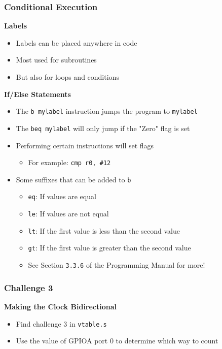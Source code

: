 \documentclass{beamer}
\begin{document}
\begin{frame}
    \frametitle{Conditional Execution}
	\textbf{Labels}
    \begin{itemize}
        \item Labels can be placed anywhere in code
		\item Most used for subroutines
		\item But also for loops and conditions
    \end{itemize}
    \textbf{If/Else Statements}
    \begin{itemize}
		\item The \texttt{b mylabel} instruction jumps the program to \texttt{mylabel}
		\item The \texttt{beq mylabel} will only jump if the "Zero" flag is set
		\item Performing certain instructions will set flags
		\begin{itemize}
			\item For example: \texttt{cmp r0, \#12}
		\end{itemize}
		\item Some suffixes that can be added to \texttt{b}
		\begin{itemize}
			\item \texttt{\texttildelow eq}: If values are equal
			\item \texttt{\texttildelow le}: If values are not equal
			\item \texttt{\texttildelow lt}: If the first value is less than the second value
			\item \texttt{\texttildelow gt}: If the first value is greater than the second value
			\item See Section \texttt{3.3.6} of the Programming Manual for more!
		\end{itemize}
    \end{itemize}
\end{frame}

\begin{frame}
	\frametitle{Challenge 3}
	\textbf{Making the Clock Bidirectional}
	\begin{itemize}
		\item Find challenge 3 in \texttt{vtable.s}
		\item Use the value of GPIOA port 0 to determine which way to count
	\end{itemize}
\end{frame}
\end{document}
